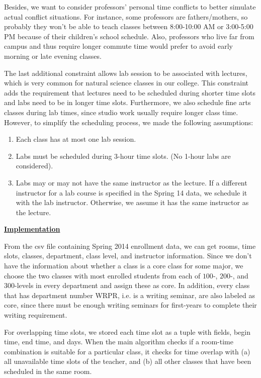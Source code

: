\documentclass[11pt, oneside]{article}   	%
\begin{document}
Besides, we want to consider professors' personal time conflicts to better simulate actual conflict situations. For instance, some professors are fathers/mothers, so probably they won't be able to teach classes between 8:00-10:00 AM or 3:00-5:00 PM because of their children's school schedule. Also, professors who live far from campus and thus require longer commute time would prefer to avoid early morning or late evening classes. \par
 The last additional constraint allows lab session to be associated with lectures, which is very common for natural science classes in our college. This constraint adds the requirement that lectures need to be scheduled during shorter time slots and labs need to be in longer time slots. Furthermore, we also schedule fine arts classes during lab times, since studio work usually require longer class time. However, to simplify the scheduling process, we made the following assumptions:\begin{enumerate}[\label = (1)]
 \item Each class has at most one lab session.
 \item Labs must be scheduled during 3-hour time slots. (No 1-hour labs are considered).
 \item Labs may or may not have the same instructor as the lecture. If a different instructor for a lab course is specified in the Spring 14 data, we schedule it with the lab instructor. Otherwise, we assume it has the same instructor as the lecture.
 \end{enumerate}
\underline {\textbf{Implementation}}\par
\par From the csv file containing Spring 2014 enrollment data, we can get rooms, time slots, classes, department, class level, and instructor information. Since we don't have the information about whether a class is a core class for some major, we choose the two classes with most enrolled students from each of $100$-, $200$-, and $300$-levels in every department and assign these as core. In addition, every class that has department number WRPR, i.e. is a writing seminar, are also labeled as core, since there must be enough writing seminars for first-years to complete their writing requirement. 
\par For overlapping time slots, we stored each time slot as a tuple with fields, begin time, end time, and days. When the main algorithm checks if a room-time combination is suitable for a particular class, it checks for time overlap with (a) all unavailable time slots of the teacher, and (b) all other classes that have been scheduled in the same room.
\end{document}
